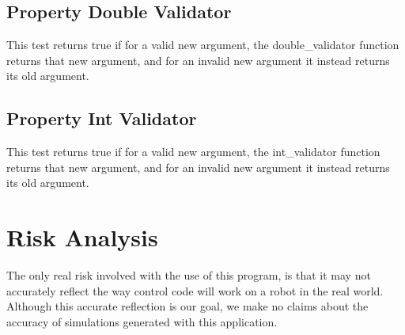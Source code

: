 \subsection{Property Double Validator}
This test returns true if for a valid new argument, the double\_validator function returns that new argument, and for an invalid new argument it instead returns its old argument.

\subsection{Property Int Validator}
This test returns true if for a valid new argument, the int\_validator function returns that new argument, and for an invalid new argument it instead returns its old argument.

\section{Risk Analysis}
The only real risk involved with the use of this program, is that it may not accurately reflect the way control code will work on a robot in the real world. Although this accurate reflection is our goal, we make no claims about the accuracy of simulations generated with this application.